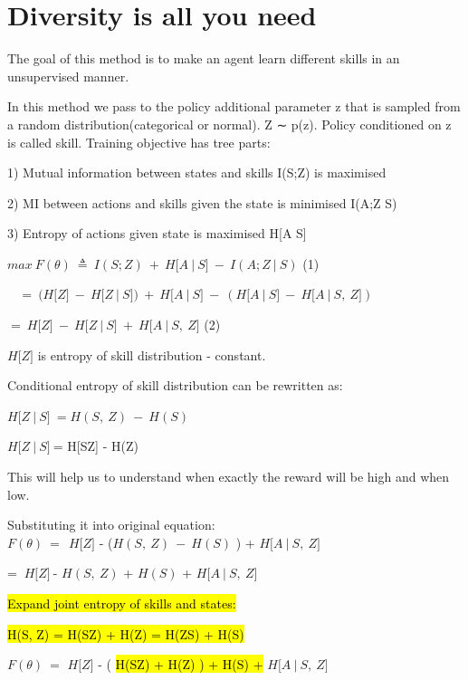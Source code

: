 \section{Diversity is all you need}\label{diversity-is-all-you-need}

The goal of this method is to make an agent learn different skills in an unsupervised manner.

In this method we pass to the policy additional parameter z that is sampled from a random distribution(categorical or normal). Z ∼ p(z). Policy conditioned on z is called skill. Training objective has tree parts:

1) Mutual information between states and skills I(S;Z) is maximised

2) MI between actions and skills given the state is minimised I(A;Z \textbar{} S)

3) Entropy of actions given state is maximised H{[}A \textbar{} S{]}

$max\ F(\theta)\  \triangleq \ I(S;Z)\  + \ H\lbrack A\ |\ S\rbrack\  - \ I(A;Z\ |\ S)$ (1)

$\ \ \ \  = \ (H\lbrack Z\rbrack\  - \ H\lbrack Z\ |\ S\rbrack)\  + \ H\lbrack A\ |\ S\rbrack\  - \ (H\lbrack A\ |\ S\rbrack\  - \ H\lbrack A\ |\ S,\ Z\rbrack)$

$= \ H\lbrack Z\rbrack\  - \ H\lbrack Z\ |\ S\rbrack\  + \ H\lbrack A\ |\ S,\ Z\rbrack$ (2)

$H\lbrack Z\rbrack$ is entropy of skill distribution - constant.

Conditional entropy of skill distribution can be rewritten as:

$H\lbrack Z\ |\ S\rbrack\  = H(S,\ Z)\  - \ H(S)$

$H\lbrack Z\ |\ S\rbrack\ $= H{[}S\textbar Z{]} - H(Z)

This will help us to understand when exactly the reward will be high and when low.

Substituting it into original equation:\\
$F(\theta)\  = \ \ H\lbrack Z\rbrack$ - ($H(S,\ Z)\  - \ H(S)$ ) + $H\lbrack A\ |\ S,\ Z\rbrack$

= $\ H\lbrack Z\rbrack\ $- $H(S,\ Z)$ + $H(S)$ + $H\lbrack A\ |\ S,\ Z\rbrack$

\hl{Expand joint entropy of skills and states:}

\hl{H(S, Z) = H(S\textbar Z) + H(Z) = H(Z\textbar S) + H(S)}

$F(\theta)\  =$ $H\lbrack Z\rbrack$ - ( \hl{H(S\textbar Z) + H(Z) ) + H(S) +} $H\lbrack A\ |\ S,\ Z\rbrack$

